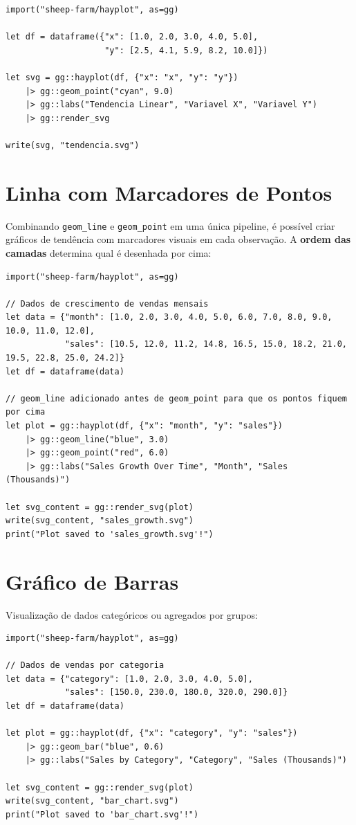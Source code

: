 \documentclass[12pt, a4paper, oneside]{book}
\newcommand{\code}[1]{\texttt{#1}}
\begin{document}
\begin{lstlisting}[caption={Usando quebras de linha na pipeline}]
import("sheep-farm/hayplot", as=gg)

let df = dataframe({"x": [1.0, 2.0, 3.0, 4.0, 5.0],
                    "y": [2.5, 4.1, 5.9, 8.2, 10.0]})

let svg = gg::hayplot(df, {"x": "x", "y": "y"})
    |> gg::geom_point("cyan", 9.0)
    |> gg::labs("Tendencia Linear", "Variavel X", "Variavel Y")
    |> gg::render_svg

write(svg, "tendencia.svg")
\end{lstlisting}

\section{Linha com Marcadores de Pontos}

Combinando \code{geom\_line} e \code{geom\_point} em uma única pipeline, é
possível criar gráficos de tendência com marcadores visuais em cada observação.
A \textbf{ordem das camadas} determina qual é desenhada por cima:

\begin{lstlisting}[caption={examples/line\_and\_scatter.hay}]
import("sheep-farm/hayplot", as=gg)

// Dados de crescimento de vendas mensais
let data = {"month": [1.0, 2.0, 3.0, 4.0, 5.0, 6.0, 7.0, 8.0, 9.0, 10.0, 11.0, 12.0],
            "sales": [10.5, 12.0, 11.2, 14.8, 16.5, 15.0, 18.2, 21.0, 19.5, 22.8, 25.0, 24.2]}
let df = dataframe(data)

// geom_line adicionado antes de geom_point para que os pontos fiquem por cima
let plot = gg::hayplot(df, {"x": "month", "y": "sales"})
    |> gg::geom_line("blue", 3.0)
    |> gg::geom_point("red", 6.0)
    |> gg::labs("Sales Growth Over Time", "Month", "Sales (Thousands)")

let svg_content = gg::render_svg(plot)
write(svg_content, "sales_growth.svg")
print("Plot saved to 'sales_growth.svg'!")
\end{lstlisting}

\section{Gráfico de Barras}

Visualização de dados categóricos ou agregados por grupos:

\begin{lstlisting}[caption={examples/bar\_chart.hay}]
import("sheep-farm/hayplot", as=gg)

// Dados de vendas por categoria
let data = {"category": [1.0, 2.0, 3.0, 4.0, 5.0],
            "sales": [150.0, 230.0, 180.0, 320.0, 290.0]}
let df = dataframe(data)

let plot = gg::hayplot(df, {"x": "category", "y": "sales"})
    |> gg::geom_bar("blue", 0.6)
    |> gg::labs("Sales by Category", "Category", "Sales (Thousands)")

let svg_content = gg::render_svg(plot)
write(svg_content, "bar_chart.svg")
print("Plot saved to 'bar_chart.svg'!")
\end{lstlisting}
\end{document}
